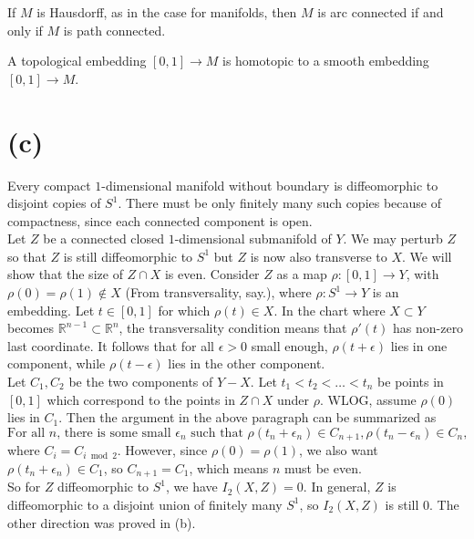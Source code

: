 \documentclass{amsbook}
\theoremstyle{theorem}
\theoremstyle{plain}
\theoremstyle{remark}
\newcommand{\R}{\mathbb R}
\begin{document}
\begin{theorem}
  If $M$ is Hausdorff, as in the case for manifolds, then $M$ is arc connected if and only if $M$ is path connected.
\end{theorem}
\begin{lemma}
  A topological embedding $[0,1]\to M$ is homotopic to a smooth embedding $[0,1]\to M$.
\end{lemma}

\section*{(c)}
Every compact $1$-dimensional manifold without boundary is diffeomorphic to disjoint copies of $S^1$. There must be only finitely many such copies because of compactness, since each connected component is open. \\

Let $Z$ be a connected closed $1$-dimensional submanifold of $Y$. We may perturb $Z$ so that $Z$ is still diffeomorphic to $S^1$ but $Z$ is now also transverse to $X$. We will show that the size of $Z \cap X$ is even. Consider $Z$ as a map $\rho: [0,1] \to Y$, with $\rho(0) = \rho(1) \not \in X$ (From transversality, say.), where $\rho: S^1 \to Y$ is an embedding. Let $t \in [0,1]$ for which $\rho(t) \in X$. In the chart where $X\subset Y$ becomes $\R^{n-1}\subset \R^n$, the transversality condition means that $\rho'(t)$ has non-zero last coordinate. It follows that for all $\epsilon > 0$ small enough, $\rho(t+\epsilon)$ lies in one component, while $\rho(t - \epsilon)$ lies in the other component.\\ 

Let $C_1, C_2$ be the two components of $Y-X$. Let $t_1 < t_2 < \dots < t_n$ be points in $[0,1]$ which correspond to the points in $Z\cap X$ under $\rho$. WLOG, assume $\rho(0)$ lies in $C_1$. Then the argument in the above paragraph can be summarized as \[\text{For all $n$, there is some small $\epsilon_n$ such that } \rho(t_n + \epsilon_n) \in C_{n+1}, \rho(t_n-\epsilon_n) \in C_n,\] where $C_i = C_{i\bmod 2}$. However, since $\rho(0) = \rho(1)$, we also want $\rho(t_n+\epsilon_n) \in C_1$, so $C_{n+1} = C_1$, which means $n$ must be even.\\

So for $Z$ diffeomorphic to $S^1$, we have $I_2(X,Z) = 0$. In general, $Z$ is diffeomorphic to a disjoint union of finitely many $S^1$, so $I_2(X,Z)$ is still $0$. The other direction was proved in (b).
\end{document}
